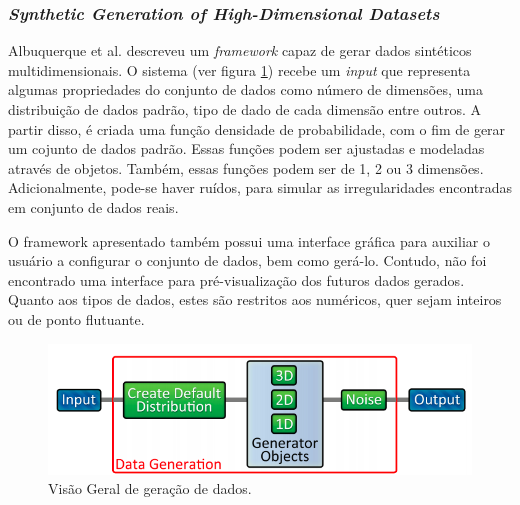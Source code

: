 \documentclass[
	12pt,				%
	openright,			%
	twoside,			%
	a4paper,			%
	english,			%
	brazil				%
	]{abntex2}
\begin{document}
	\subsubsection{\emph{Synthetic Generation of High-Dimensional Datasets}}
	Albuquerque et al. \cite{Albuquerque2011} descreveu um \emph{framework} capaz de gerar dados sintéticos multidimensionais. O sistema (ver figura \ref{fig:albuquerque}) recebe um \emph{input} que representa algumas propriedades do conjunto de dados como número de dimensões, uma distribuição de dados padrão, tipo de dado de cada dimensão entre outros. A partir disso, é criada uma função densidade de probabilidade, com o fim de gerar um cojunto de dados padrão. Essas funções podem ser ajustadas e modeladas através de objetos. Também, essas funções podem ser de 1, 2 ou 3 dimensões. Adicionalmente, pode-se haver ruídos, para simular as irregularidades encontradas em conjunto de dados reais.
	\par
	O framework apresentado também possui uma interface gráfica para auxiliar o usuário a configurar o conjunto de dados, bem como gerá-lo. Contudo, não foi encontrado uma interface para pré-visualização dos futuros dados gerados. Quanto aos tipos de dados, estes são restritos aos numéricos, quer sejam inteiros ou de ponto flutuante.    
	\begin{figure}[h!]
		\centering
		\includegraphics[width=\linewidth]{./figures/TrabalhosRelacionados/Albuquerque10.png}
		\caption{Visão Geral de geração de dados.}
		\label{fig:albuquerque}
	\end{figure}
\end{document}

